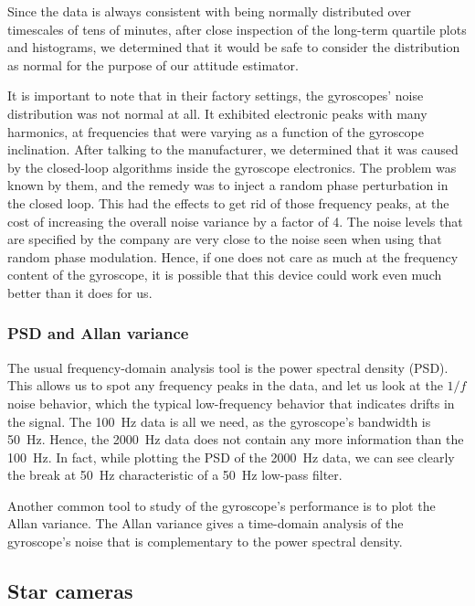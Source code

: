 Since the data is always consistent with being normally distributed over timescales of tens of minutes, after close inspection of the long-term quartile plots and histograms, we determined that it would be safe to consider the distribution as normal for the purpose of our attitude estimator. 

It is important to note that in their factory settings, the gyroscopes' noise distribution was not normal at all. It exhibited electronic peaks with many harmonics, at frequencies that were varying as a function of the gyroscope inclination. After talking to the manufacturer, we determined that it was caused by the closed-loop algorithms inside the gyroscope electronics. The problem was known by them, and the remedy was to inject a random phase perturbation in the closed loop. This had the effects to get rid of those frequency peaks, at the cost of increasing the overall noise variance by a factor of 4. The noise levels that are specified by the company are very close to the noise seen when using that random phase modulation. Hence, if one does not care as much at the frequency content of the gyroscope, it is possible that this device could work even much better than it does for us.

\subsubsection{PSD and Allan variance}

The usual frequency-domain analysis tool is the power spectral density (PSD). This allows us to spot any frequency peaks in the data, and let us look at the $1/f$ noise behavior, which the typical low-frequency behavior that indicates drifts in the signal. The \SI{100}{\hertz} data is all we need, as the gyroscope's bandwidth is \SI{50}{\hertz}. Hence, the \SI{2000}{\hertz} data does not contain any more information than the \SI{100}{\hertz}. In fact, while plotting the PSD of the \SI{2000}{\hertz} data, we can see clearly the break at \SI{50}{\hertz} characteristic of a \SI{50}{\hertz} low-pass filter.

Another common tool to study of the gyroscope's performance is to plot the Allan variance. The Allan variance gives a time-domain analysis of the gyroscope's noise that is complementary to the power spectral density.

\subsection{Star cameras}

